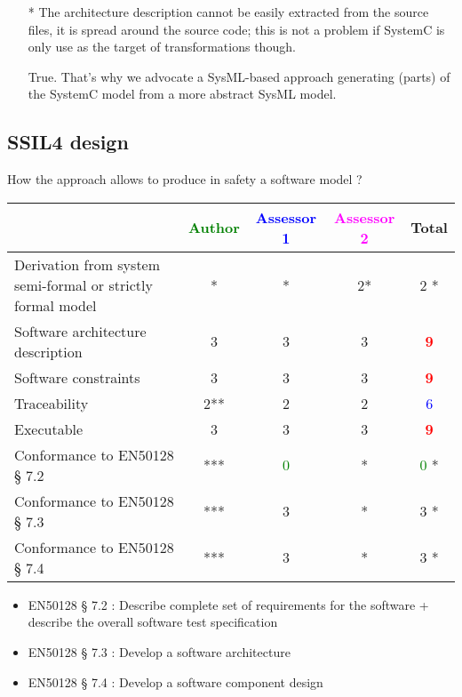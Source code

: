 \begin{assessor2}
  \begin{itemize}
  \item[*] The architecture description cannot be easily extracted
    from the source files, it is spread around the source code; this
    is not a problem if SystemC is only use as the target of
    transformations though.
\begin{author_comment}
True. That's why we advocate a SysML-based approach generating (parts) of the SystemC model from a more abstract SysML model.
\end{author_comment}
  \end{itemize}  
\end{assessor2}


\subsection{SSIL4 design}

How the approach allows to produce in safety a software model ?

\begin{tabular}{|l | c | c | c | c|}
\hline
& \textcolor{green}{Author} & \textcolor{blue}{Assessor 1} & \textcolor{magenta}{Assessor 2} & Total \\
\hline
Derivation from system semi-formal or strictly formal model &* & * &2* & 2   * \\
\hline
Software architecture description &3 & 3    &3 & \textcolor{red}{\textbf{9}} \\
\hline
Software constraints &3 &3 &3 & \textcolor{red}{\textbf{9}} \\
\hline
Traceability &2** &2 &2 & \textcolor{blue}{6} \\
\hline
Executable &3 &3 &3 & \textcolor{red}{\textbf{9}} \\
\hline
Conformance to EN50128 § 7.2 &*** & \textcolor{green}{0}   & *  & \textcolor{green}{0} * \\
\hline
Conformance to EN50128 § 7.3 &*** &3 &  * & 3   * \\
\hline
Conformance to EN50128 § 7.4 &*** &3 & * & 3   * \\
\hline
\end{tabular}
\begin{assessor1}
\begin{itemize}
\item  EN50128 § 7.2 : Describe complete set of requirements for the
  software + describe the overall software test specification
\item EN50128 § 7.3 :  Develop a software architecture 
\item EN50128 § 7.4 : Develop a software component design
\end{itemize}
\end{assessor1}

